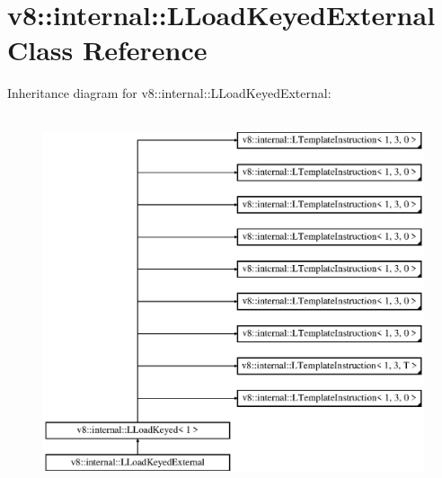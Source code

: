 \hypertarget{classv8_1_1internal_1_1_l_load_keyed_external}{}\section{v8\+:\+:internal\+:\+:L\+Load\+Keyed\+External Class Reference}
\label{classv8_1_1internal_1_1_l_load_keyed_external}
Inheritance diagram for v8\+:\+:internal\+:\+:L\+Load\+Keyed\+External\+:\begin{figure}[H]
\begin{center}
\leavevmode
\includegraphics[height=11.000000cm]{classv8_1_1internal_1_1_l_load_keyed_external}
\end{center}
\end{figure}
